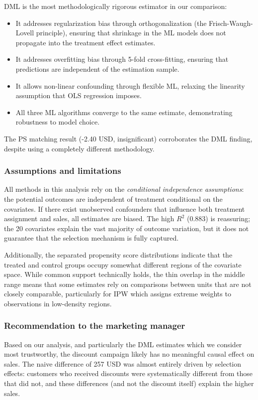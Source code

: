 \documentclass[10pt]{article}
\begin{document}
DML is the most methodologically rigorous estimator in our comparison: 
\begin{itemize}
    \item It addresses regularization bias through orthogonalization (the Frisch-Waugh-Lovell principle), ensuring that shrinkage in the ML models does not propagate into the treatment effect estimates. 
    \item It addresses overfitting bias through 5-fold cross-fitting, ensuring that predictions are independent of the estimation sample. 
    \item It allows non-linear confounding through flexible ML, relaxing the linearity assumption that OLS regression imposes. 
    \item All three ML algorithms converge to the same estimate, demonstrating robustness to model choice. 
\end{itemize}
The PS matching result (-2.40 USD, insignificant) corroborates the DML finding, despite using a completely different methodology. 

\subsubsection{Assumptions and limitations}
All methods in this analysis rely on the \textit{conditional independence assumptions}: the potential outcomes are independent of treatment conditional on the covariates. If there exist unobserved confounders that influence both treatment assignment and sales, all estimates are biased. The high $R^2 $ (0.883) is reassuring; the 20 covariates explain the vast majority of outcome variation, but it does not guarantee that the selection mechanism is fully captured. 

Additionally, the separated propensity score distributions indicate that the treated and control groups occupy somewhat different regions of the covariate space. While common support technically holds, the thin overlap in the middle range means that some estimates rely on comparisons between units that are not closely comparable, particularly for IPW which assigns extreme weights to observations in low-density regions. 

\subsubsection{Recommendation to the marketing manager}
Based on our analysis, and particularly the DML estimates which we consider most trustworthy, the discount campaign likely has no meaningful causal effect on sales. The naive difference of 257 USD was almost entirely driven by selection effects: customers who received discounts were systematically different from those that did not, and these differences (and not the discount itself) explain the higher sales. 
\end{document}
